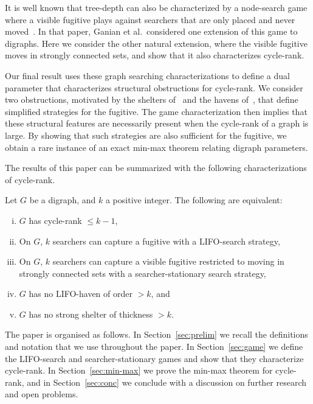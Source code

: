 \documentclass{llncs}
\begin{document}
It is well known that tree-depth can also be characterized by a node-search game where a visible fugitive plays against searchers that are only placed and never moved~\cite{GHKLOR09}.  In that paper, Ganian et al.~considered one extension of this game to digraphs.  Here we consider the other natural extension, where the visible fugitive moves in strongly connected sets, and show that it also characterizes cycle-rank.

Our final result uses these graph searching characterizations to define a dual parameter that characterizes structural obstructions for cycle-rank.  We consider two obstructions, motivated by the shelters of~\cite{GT11} and the havens of~\cite{JRST01}, that define simplified strategies for the fugitive. The game characterization then implies that these structural features are necessarily present when the cycle-rank of a graph is large.  By showing that such strategies are also sufficient for the fugitive, we obtain a rare instance of an exact min-max theorem relating digraph parameters.

The results of this paper can be summarized with the following characterizations of cycle-rank.
\begin{mainthm}\label{thm:main2}
Let $G$ be a digraph, and $k$ a positive integer.  The following are equivalent:
\begin{enumerate}[(i) ]
\item $G$ has cycle-rank $\leq k-1$,
\item On $G$, $k$ searchers can capture a fugitive with a LIFO-search strategy,
\item On $G$, $k$ searchers can capture a visible fugitive restricted to moving in strongly connected sets with a searcher-stationary search strategy,
\item $G$ has no LIFO-haven of order $> k$, and
\item $G$ has no strong shelter of thickness $>k$.
\end{enumerate}
\end{mainthm}

The paper is organised as follows.  In Section~\ref{sec:prelim} we recall the definitions and notation that we use throughout the paper.  In Section~\ref{sec:game} we define the LIFO-search and searcher-stationary games and show that they characterize cycle-rank.  In Section~\ref{sec:min-max} we prove the min-max theorem for cycle-rank, and in Section~\ref{sec:conc} we conclude with a discussion on further research and open problems.
\end{document}
